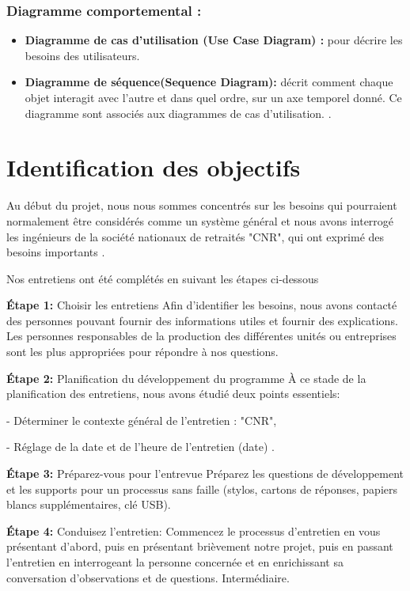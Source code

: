  
  \subsubsection{Diagramme comportemental  : }
 
  \begin{itemize}
 	\item \textbf{Diagramme de cas d’utilisation (Use Case Diagram) : } pour décrire les besoins des utilisateurs. 
 	\item  \textbf{Diagramme de séquence(Sequence Diagram):}  décrit comment chaque objet interagit avec l’autre et dans quel ordre, sur un axe temporel donné. Ce diagramme sont associés aux diagrammes de cas d’utilisation.
 	. 
 \end{itemize}



\section{Identification des objectifs}

Au début du projet, nous nous sommes concentrés sur les besoins qui pourraient normalement être considérés comme un système général et nous avons interrogé les ingénieurs de la société nationaux de retraités    "CNR", qui ont exprimé des besoins importants .
 
 
 Nos entretiens ont été complétés en suivant les étapes ci-dessous
 
\textbf{ Étape 1:} Choisir les entretiens Afin d'identifier les besoins, nous avons contacté des personnes pouvant fournir des informations utiles et fournir des explications. Les personnes responsables de la production des différentes unités ou entreprises sont les plus appropriées pour répondre à nos questions.
 
\textbf{Étape 2:}
Planification du développement du programme À ce stade de la planification des entretiens, nous avons étudié deux points essentiels:

- Déterminer le contexte général de l'entretien : "CNR",

- Réglage de la date et de l'heure de l'entretien (date) .

\textbf{ Étape 3:} Préparez-vous pour l’entrevue Préparez les questions de développement et les supports pour un processus sans faille (stylos, cartons de réponses, papiers blancs supplémentaires, clé USB).


\textbf{ Étape 4:} Conduisez l’entretien: Commencez le processus d’entretien en vous présentant d’abord, puis en présentant brièvement notre projet, puis en passant l’entretien en interrogeant la personne concernée et en enrichissant sa conversation d’observations et de questions. Intermédiaire.
 

